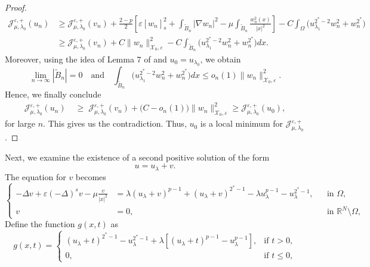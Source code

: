 \documentclass[11pt]{article}
\newcommand{\la} {\lambda}
\newcommand{\lv}{\lVert}
\newcommand{\rv}{\rVert}
\newcommand{\Xe}{\mathcal{X}_{0},\varepsilon} %
\newcommand{\Jepo}{\mathcal{J}_{\mu, \lambda_0}^{\varepsilon,+}}
\begin{document}
\begin{proof}
\begin{equation*}
\begin{aligned}
\Jepo(u_n) 
&\geq\Jepo(v_n) 
+ \frac{2-p}{2} 
\left[ \varepsilon [w_n]_s^2 + \int_{\widetilde{B}_n} |\nabla w_n|^2  
- \mu \int_{\widetilde{B}_n} \frac{w_n^2(x)}{|x|^2} \right] - C \int_{\Omega} \Big( u_{\lambda_1}^{2^*-2} w_n^2 + w_n^{2^*} \Big)\\
& \geq \Jepo(v_n) + C \|w_n\|_{\Xe}^2 
- C \int_{\widetilde{B}_n} \Big( u_{\lambda_1}^{2^*-2} w_n^2 + w_n^{2^*} \Big) dx .
\end{aligned}
\end{equation*}
Moreover, using the idea of Lemma $7$ of \cite{shen_multiplicity_fractional} and $u_0 = u_{\la_0}$, we obtain
\begin{equation*}
\lim_{n \to \infty} |\widetilde{B}_n| = 0 \quad \text{and} \quad \int_{\widetilde{B}_n} \Big( u_{\lambda_1}^{2^*-2} w_n^2 + w_n^{2^*} \Big) dx \leq o_n(1) \lv w_n\rv_{\Xe}^2.
\end{equation*}
Hence, we finally conclude
\begin{equation*}
\begin{aligned}
\Jepo(u_n) 
&\;\geq\; \Jepo(v_n) + \big(C - o_n(1)\big)\|w_n\|_{\Xe}^2 \geq  \Jepo(u_0),
\end{aligned}
\end{equation*}
for large $n$. This gives us the contradiction. Thus, $u_0$ is a local minimum for $\Jepo$.
\end{proof}
Next, we examine the existence of a second positive solution of the form
\begin{equation*}
u = u_{\lambda} + v.
\end{equation*}
The equation for $v$ becomes
\begin{equation}
\left\{
\begin{aligned}
- \Delta v + \varepsilon  (-\Delta)^s v - \mu \frac{v}{|x|^2} &= \lambda (u_{\lambda} + v)^{p-1} + (u_{\lambda} + v)^{2^* - 1} - \lambda u_{\lambda}^{p-1} - u_{\lambda}^{2^* - 1}, && \text{in } \Omega, \\
v &= 0, && \text{in } \mathbb{R}^N \setminus \Omega,
\end{aligned}
\right.
\label{eq:second_solution_equation}
\end{equation}
Define the function \( g(x,t) \) as
\begin{equation*}
g(x,t) = 
\begin{cases}
(u_{\lambda} + t)^{2^*-1} - u_{\lambda}^{2^*-1} + \lambda \left[ (u_{\lambda} + t)^{p-1} - u_{\lambda}^{p-1} \right], & \text{if } t > 0, \\
0, & \text{if } t \leq 0,
\end{cases}
\end{equation*}
\end{document}
